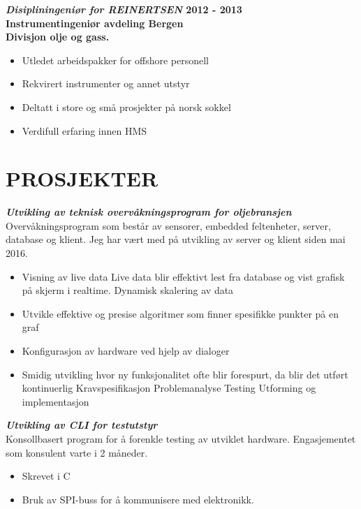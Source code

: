 \documentclass[margin, 10pt, norsk]{res} %
\begin{document}
\begin{resume}
\newpage

\textbf{\emph{Disipliningeniør for REINERTSEN} \hfill 2012 - 2013 \\
Instrumentingeniør avdeling Bergen\\
Divisjon olje og gass.}
\begin{itemize} \itemsep -2pt %
\item Utledet arbeidspakker for offshore personell 
\item Rekvirert instrumenter og annet utstyr
\item Deltatt i store og små prosjekter på norsk sokkel
\item Verdifull erfaring innen HMS
\end{itemize}

\hspace{5mm} 

\section{PROSJEKTER}

\textbf{\emph{Utvikling av teknisk overvåkningsprogram for oljebransjen}}\\
Overvåkningsprogram som består av sensorer, embedded feltenheter, server, database og klient. Jeg har vært med på utvikling av server og klient siden mai 2016. 
\begin{itemize}\itemsep -2pt   %
\item  Visning av live data
\subitem Live data blir effektivt lest fra database og vist grafisk på skjerm i realtime. 
\subitem Dynamisk skalering av data
\item Utvikle effektive og presise algoritmer som finner spesifikke punkter på en graf
\item Konfigurasjon av hardware ved hjelp av dialoger
\item Smidig utvikling hvor ny funksjonalitet ofte blir forespurt, da blir det utført kontinuerlig
\subitem Kravspesifikasjon
\subitem Problemanalyse 
\subitem Testing
\subitem Utforming og implementasjon
\end{itemize}

\textbf{\emph{Utvikling av CLI for testutstyr}}\\
Konsollbasert program for å forenkle testing av utviklet hardware. Engasjementet som konsulent varte i 2 måneder. 
\begin{itemize}\itemsep -2pt   %
\item  Skrevet i C
\item Bruk av SPI-buss for å kommunisere med elektronikk.
\end{itemize}


\end{resume}
\end{document}

